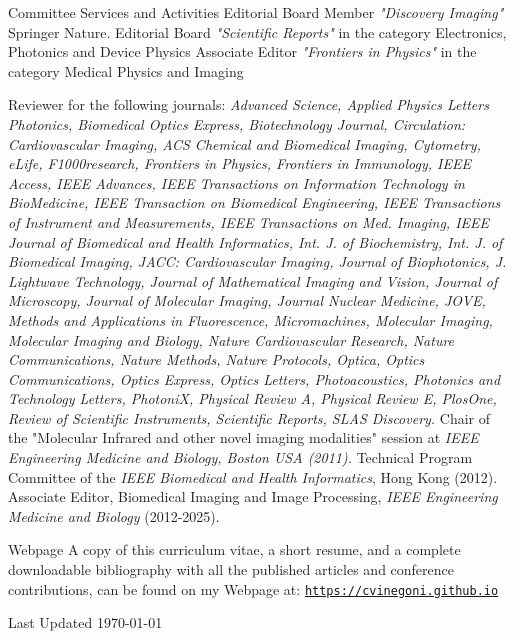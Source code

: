 \documentclass{resume}
\begin{document}
%
%
\begin{category}{Committee Services and Activities}
\citembullet 
Editorial Board Member {\it "Discovery Imaging"} Springer Nature.
\citembullet 
Editorial Board {\it "Scientific Reports"} in the category Electronics, Photonics and Device Physics
\citembullet 
Associate Editor {\it "Frontiers in Physics"} in the category Medical Physics and Imaging

\citembullet 
Reviewer for the following journals: {\it Advanced Science, Applied Physics Letters Photonics, Biomedical Optics Express, Biotechnology Journal, Circulation: Cardiovascular Imaging, ACS Chemical and Biomedical Imaging, Cytometry, eLife, F1000research, Frontiers in Physics, Frontiers in Immunology, IEEE Access, IEEE Advances, IEEE Transactions on Information Technology in BioMedicine,  IEEE Transaction on Biomedical Engineering, IEEE Transactions of Instrument and Measurements, IEEE Transactions on Med. Imaging,  IEEE Journal of Biomedical and Health Informatics, Int. J. of Biochemistry, Int. J. of Biomedical Imaging, JACC: Cardiovascular Imaging, Journal of Biophotonics, J. Lightwave Technology, Journal of Mathematical Imaging and Vision, Journal of Microscopy, Journal of Molecular Imaging, Journal Nuclear Medicine, JOVE,  Methods and Applications in Fluorescence, Micromachines, Molecular Imaging, Molecular Imaging and Biology, Nature Cardiovascular Research, Nature Communications, Nature Methods, Nature Protocols, Optica, Optics Communications, Optics Express, Optics Letters, Photoacoustics, Photonics and Technology Letters, PhotoniX, Physical Review A, Physical Review E, PlosOne, Review of Scientific Instruments, Scientific Reports, SLAS Discovery.}
\citembullet 
Chair of the "Molecular Infrared and other novel imaging modalities" session at {\it IEEE Engineering Medicine and Biology, Boston USA (2011). }
\citembullet 
Technical Program Committee of the {\it IEEE Biomedical and Health Informatics}, Hong Kong (2012).
\citembullet 
Associate Editor, Biomedical Imaging and Image Processing, {\it IEEE Engineering Medicine and Biology} (2012-2025).
\end{category}

\begin{category}{Webpage}
 \citemnobullet 
A copy of this curriculum vitae, a short
resume, and a complete downloadable bibliography with all the
published articles and conference contributions, can be found on my Webpage at:
\newline
    \mbox{\small\tt \url{https://cvinegoni.github.io}}
\end{category}

\begin{category}{Last Updated}
\citemnobullet 
\today{}
\end{category}

\end{document}
